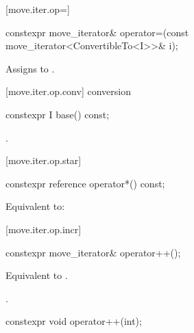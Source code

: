 [move.iter.op=]{}

%
%
\begin{itemdecl}
constexpr move_iterator& operator=(const move_iterator<ConvertibleTo<I>>& i);
\end{itemdecl}

\begin{itemdescr}
\pnum
\effects Assigns  to
.
\end{itemdescr}

[move.iter.op.conv]{ conversion}

%
%
\begin{itemdecl}
constexpr I base() const;
\end{itemdecl}

\begin{itemdescr}
\pnum
\returns {}.
\end{itemdescr}

[move.iter.op.star]{}

%
%
\begin{itemdecl}
constexpr reference operator*() const;
\end{itemdecl}

\begin{itemdescr}
\pnum
\effects Equivalent to:
\end{itemdescr}

[move.iter.op.incr]{}

%
%
\begin{itemdecl}
constexpr move_iterator& operator++();
\end{itemdecl}

\begin{itemdescr}
\pnum
\effects Equivalent to .

\pnum
\returns {}.
\end{itemdescr}

%
%
\begin{itemdecl}
constexpr void operator++(int);
\end{itemdecl}

